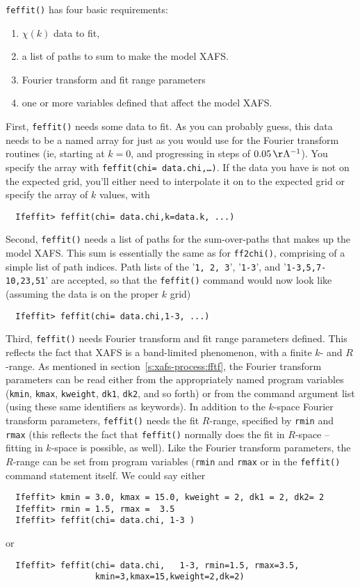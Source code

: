 \documentclass[11pt]{article}
\begin{document}
{\tt{feffit()}} has four basic requirements:
\begin{enumerate}
\item $\chi(k)$ data to fit,
\item a list of paths to sum  to make the model XAFS.
\item Fourier transform and fit range parameters
\item one or more variables defined that affect the model XAFS.
\end{enumerate}
\noindent

First, {\tt{feffit()}} needs some {\chik} data to fit.  As you can probably
guess, this data needs to be a named array for {\chik} just as you would
use for the Fourier transform routines (ie, starting at $k=0$, and
progressing in steps of $0.05\rm\,\AA^{-1}$).  You specify the {\chik}
array with {\tt{feffit(chi= data.chi,\ldots)}}.  If the data you have is
not on the expected grid, you'll either need to interpolate it on to the
expected grid or specify the array of $k$ values, with
{\small\begin{verbatim}
  Ifeffit> feffit(chi= data.chi,k=data.k, ...)
\end{verbatim}
}\noindent
Second, {\tt{feffit()}} needs a list of paths for the sum-over-paths that
makes up the model XAFS.  This sum is essentially the same as for
{\tt{ff2chi()}}, comprising of a simple list of path indices.  Path lists
of the '{\tt{1, 2, 3}}', '{\tt{1-3}}', and '{\tt{1-3,5,7-10,23,51}}' are
accepted, so that the {\tt{feffit()}} command would now look like
(assuming the data is on the proper $k$ grid)
{\small\begin{verbatim}
  Ifeffit> feffit(chi= data.chi,1-3, ...)
\end{verbatim}
}\noindent
Third, {\tt{feffit()}} needs Fourier transform and fit range parameters
defined.  This reflects the fact that XAFS is a band-limited phenomenon,
with a finite $k$- and $R$-range.  As mentioned in
section~\ref{s:xafs-process:fftf}, the Fourier transform parameters can be
read either from the appropriately named program variables ({\tt{kmin}},
{\tt{kmax}}, {\tt{kweight}}, {\tt{dk1}}, {\tt{dk2}}, and so forth) or from
the command argument list (using these same identifiers as keywords).
In addition to the $k$-space Fourier transform parameters, {\tt{feffit()}}
needs the fit $R$-range, specified by {\tt{rmin}} and {\tt{rmax}} 
(this reflects the fact that {\tt{feffit()}} normally does the fit in
$R$-space -- fitting in $k$-space is possible, as well).  Like the Fourier
transform parameters, the $R$-range can be set from program variables
({\tt{rmin}} and {\tt{rmax}} or in the {\tt{feffit()}} command statement itself.
We could say either
{\small\begin{verbatim}
  Ifeffit> kmin = 3.0, kmax = 15.0, kweight = 2, dk1 = 2, dk2= 2
  Ifeffit> rmin = 1.5, rmax =  3.5
  Ifeffit> feffit(chi= data.chi, 1-3 )
\end{verbatim}
}\noindent
or
{\small\begin{verbatim}
  Ifeffit> feffit(chi= data.chi,   1-3, rmin=1.5, rmax=3.5, 
                  kmin=3,kmax=15,kweight=2,dk=2)
\end{verbatim}
}\noindent
\end{document}
